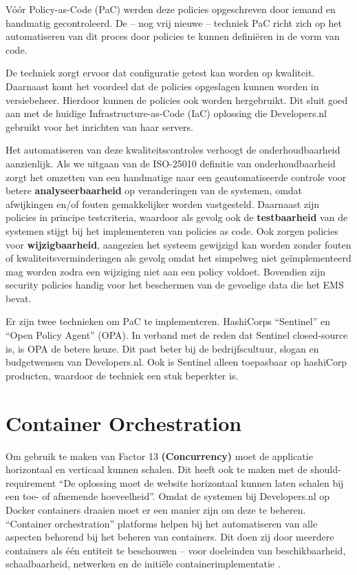Vóór Policy-as-Code (PaC) werden deze policies opgeschreven door iemand en handmatig gecontroleerd. De -- nog vrij nieuwe -- techniek PaC richt zich op het automatiseren van dit proces door policies te kunnen definiëren in de vorm van code. 

De techniek zorgt ervoor dat configuratie getest kan worden op kwaliteit. Daarnaast komt het voordeel dat de policies opgeslagen kunnen worden in versiebeheer. Hierdoor kunnen de policies ook worden hergebruikt. Dit sluit goed aan met de huidige Infrastructure-as-Code (IaC) oplossing die Developers.nl gebruikt voor het inrichten van haar servers.

Het automatiseren van deze kwaliteitscontroles verhoogt de onderhoudbaarheid aanzienlijk. Als we uitgaan van de ISO-25010 definitie van onderhoudbaarheid \parencite{ISO25010} zorgt het omzetten van een handmatige naar een geautomatiseerde controle voor betere \textbf{analyseerbaarheid} op veranderingen van de systemen, omdat afwijkingen en/of fouten gemakkelijker worden vastgesteld. Daarnaast zijn policies in principe testcriteria, waardoor als gevolg ook de \textbf{testbaarheid} van de systemen stijgt bij het implementeren van policies as code. Ook zorgen policies voor \textbf{wijzigbaarheid}, aangezien het systeem gewijzigd kan worden zonder fouten of kwaliteitsverminderingen als gevolg omdat het simpelweg niet geïmplementeerd mag worden zodra een wijziging niet aan een policy voldoet. Bovendien zijn security policies handig voor het beschermen van de gevoelige data die het EMS bevat.

Er zijn twee technieken om PaC te implementeren. HashiCorps \enquote{Sentinel} en \enquote{Open Policy Agent} (OPA). In verband met de reden dat Sentinel closed-source is, is OPA de betere keuze. Dit past beter bij de bedrijfscultuur, slogan en budgetwensen van Developers.nl. Ook is Sentinel alleen toepasbaar op hashiCorp producten, waardoor de techniek een stuk beperkter is.

\section{Container Orchestration}
\label{ContainerOrchestration}
Om gebruik te maken van Factor 13 \textbf{(Concurrency)} moet de applicatie horizontaal en verticaal kunnen schalen. Dit heeft ook te maken met de should-requirement \enquote{De oplossing moet de website horizontaal kunnen laten schalen bij een toe- of afnemende hoeveelheid}. Omdat de systemen bij Developers.nl op Docker containers draaien moet er een manier zijn om deze te beheren. \enquote{Container orchestration} platforms helpen bij het automatiseren van alle aspecten behorend bij het beheren van containers. Dit doen zij door meerdere containers als één entiteit te beschouwen -- voor doeleinden van beschikbaarheid, schaalbaarheid, netwerken en de initiële containerimplementatie \parencite{ContainerOrchestration}.

